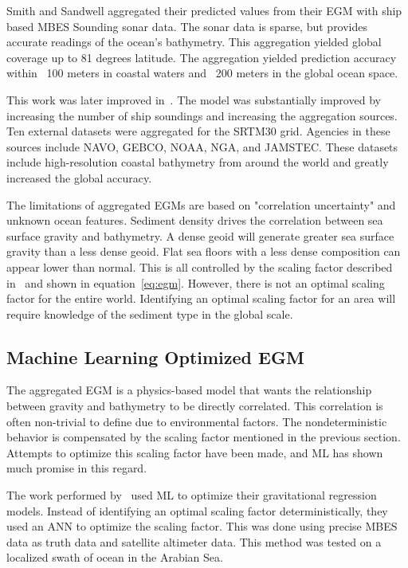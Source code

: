 \par
Smith and Sandwell aggregated their predicted values from their \ac{EGM} with ship based \ac{MBES} Sounding sonar data.
The sonar data is sparse, but provides accurate readings of the ocean's bathymetry.
This aggregation yielded global coverage up to 81 degrees latitude.
The aggregation yielded prediction accuracy within ~100 meters in coastal waters and ~200 meters in the global ocean space.

\par 
This work was later improved in~\cite{becker2009global}.
The model was substantially improved by increasing the number of ship soundings and increasing the aggregation sources.
Ten external datasets were aggregated for the SRTM30 grid.
Agencies in these sources include \ac{NAVO}, \ac{GEBCO}, \ac{NOAA}, \ac{NGA}, and \ac{JAMSTEC}.
These datasets include high-resolution coastal bathymetry from around the world and greatly increased the global accuracy.

\par
The limitations of aggregated \ac{EGM}s are based on "correlation uncertainty" and unknown ocean features.
Sediment density drives the correlation between sea surface gravity and bathymetry.
A dense geoid will generate greater sea surface gravity than a less dense geoid.
Flat sea floors with a less dense composition can appear lower than normal.
This is all controlled by the scaling factor described in~\cite{smith1994bathymetric} and shown in equation~\ref{eq:egm}.
However, there is not an optimal scaling factor for the entire world.
Identifying an optimal scaling factor for an area will require knowledge of the sediment type in the global scale.


\subsection{Machine Learning Optimized \ac{EGM}}\label{subsec:machine-learning-optimizedac}
The aggregated \ac{EGM} is a physics-based model that wants the relationship between gravity and bathymetry to be directly correlated.
This correlation is often non-trivial to define due to environmental factors.
The nondeterministic behavior is compensated by the scaling factor mentioned in the previous section.
Attempts to optimize this scaling factor have been made, and \ac{ML} has shown much promise in this regard.

\par
The work performed by~\cite{jena2012prediction} used \ac{ML} to optimize their gravitational regression models.
Instead of identifying an optimal scaling factor deterministically, they used an \ac{ANN} to optimize the scaling factor.
This was done using precise \ac{MBES} data as truth data and satellite altimeter data.
This method was tested on a localized swath of ocean in the Arabian Sea.

